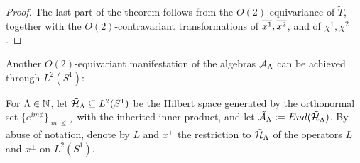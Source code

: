 \begin{proof}
The last part of the theorem follows from the $O(2)$-equivariance of $\tilde T$, together with the $O(2)$-contravariant transformations of $\overline{x^1}, \overline{x^2}$, and of $\chi^1, \chi^2$.
\end{proof}

\lin

Another $O(2)$-equivariant manifestation of the algebras $\mathcal A_\Lambda$ can be achieved through $L^2(S^1)$:
\begin{definition}
For $\Lambda \in \mathbb{N}$, let $\tilde{\mathcal H}_\Lambda \subseteq L^2(S^1)$ be the Hilbert space generated by the orthonormal set $\{e^{im\phi}\}_{|m|\leq \Lambda}$ with the inherited inner product, and let $\tilde {\mathcal A}_\Lambda := End(\tilde {\mathcal H}_\Lambda)$. By abuse of notation, denote by $L$ and $x^\pm$ the restriction to $\tilde {\mathcal H}_\Lambda$ of the operators $L$ and $x^\pm$ on $L^2(S^1)$.
\end{definition}

